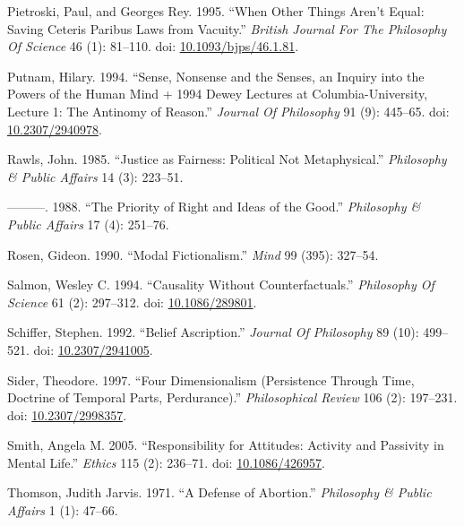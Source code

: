 \documentclass[
  10pt,
  letterpaper,
  DIV=11,
  numbers=noendperiod,
  twoside]{scrartcl}
\newlength{\cslhangindent}
\newenvironment{CSLReferences}[2] %
 {\begin{list}{}{%
  \setlength{\itemindent}{0pt}
  \setlength{\leftmargin}{0pt}
  \setlength{\parsep}{0pt}
  \ifodd #1
   \setlength{\leftmargin}{\cslhangindent}
   \setlength{\itemindent}{-1\cslhangindent}
  \fi
  \setlength{\itemsep}{#2\baselineskip}}}
 {\end{list}}
\begin{document}
\begin{CSLReferences}{1}{0}
Pietroski, Paul, and Georges Rey. 1995. {``When Other Things Aren't
Equal: Saving Ceteris Paribus Laws from Vacuity.''} \emph{British
Journal For The Philosophy Of Science} 46 (1): 81--110. doi:
\href{https://doi.org/10.1093/bjps/46.1.81}{10.1093/bjps/46.1.81}.

Putnam, Hilary. 1994. {``Sense, Nonsense and the Senses, an Inquiry into
the Powers of the Human Mind + 1994 Dewey Lectures at
Columbia-University, Lecture 1: The Antinomy of Reason.''} \emph{Journal
Of Philosophy} 91 (9): 445--65. doi:
\href{https://doi.org/10.2307/2940978}{10.2307/2940978}.

Rawls, John. 1985. {``Justice as Fairness: Political Not
Metaphysical.''} \emph{Philosophy \& Public Affairs} 14 (3): 223--51.

---------. 1988. {``The Priority of Right and Ideas of the Good.''}
\emph{Philosophy \& Public Affairs} 17 (4): 251--76.

Rosen, Gideon. 1990. {``Modal Fictionalism.''} \emph{Mind} 99 (395):
327--54.

Salmon, Wesley C. 1994. {``Causality Without Counterfactuals.''}
\emph{Philosophy Of Science} 61 (2): 297--312. doi:
\href{https://doi.org/10.1086/289801}{10.1086/289801}.

Schiffer, Stephen. 1992. {``Belief Ascription.''} \emph{Journal Of
Philosophy} 89 (10): 499--521. doi:
\href{https://doi.org/10.2307/2941005}{10.2307/2941005}.

Sider, Theodore. 1997. {``Four Dimensionalism (Persistence Through Time,
Doctrine of Temporal Parts, Perdurance).''} \emph{Philosophical Review}
106 (2): 197--231. doi:
\href{https://doi.org/10.2307/2998357}{10.2307/2998357}.

Smith, Angela M. 2005. {``Responsibility for Attitudes: Activity and
Passivity in Mental Life.''} \emph{Ethics} 115 (2): 236--71. doi:
\href{https://doi.org/10.1086/426957}{10.1086/426957}.

Thomson, Judith Jarvis. 1971. {``A Defense of Abortion.''}
\emph{Philosophy \& Public Affairs} 1 (1): 47--66.


\end{CSLReferences}
\end{document}
